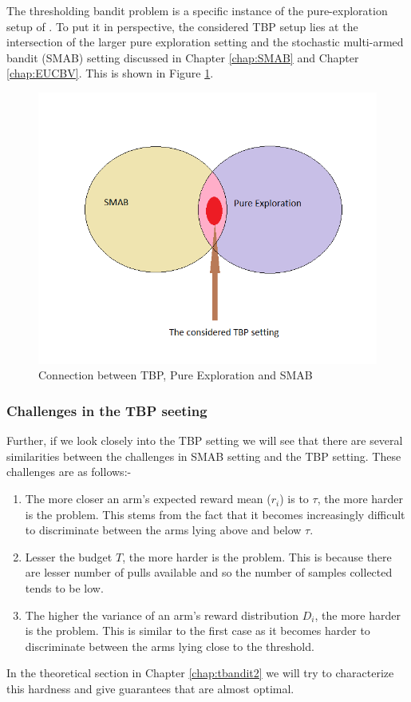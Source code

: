 The thresholding bandit problem is a specific instance of the pure-exploration setup of \citet{chen2014combinatorial}. To put it in perspective, the considered TBP setup lies at the intersection of the larger pure exploration setting and the stochastic multi-armed bandit (SMAB) setting discussed in Chapter \ref{chap:SMAB} and Chapter \ref{chap:EUCBV}. This is shown in Figure \ref{fig:con}.

\begin{figure}[!th]
\includegraphics[scale=0.7]{Chapter4/img/connection_TBP.png}
\caption{Connection between TBP, Pure Exploration and SMAB}
\label{fig:con}
\end{figure}

\subsubsection{Challenges in the TBP seeting}

Further, if we look closely into the TBP setting we will see that there are several similarities between the challenges in SMAB setting and the TBP setting. These challenges are as follows:-

\begin{enumerate}
\item The more closer an arm’s expected reward mean ($r_i$) is  to $\tau$, the more harder is the problem. This stems from the fact that it becomes increasingly difficult to discriminate between the arms lying above and below $\tau$.
\item Lesser the budget $T$, the more harder is the problem. This is because there are lesser number of pulls available and so the number of samples collected tends to be low.
\item The higher the variance of an arm’s reward distribution $D_i$, the more harder is the problem. This is similar to the first case as it becomes harder to discriminate between the arms lying close to the threshold.
\end{enumerate}

In the theoretical section in Chapter \ref{chap:tbandit2} we will try to characterize this hardness and give guarantees that are almost optimal.